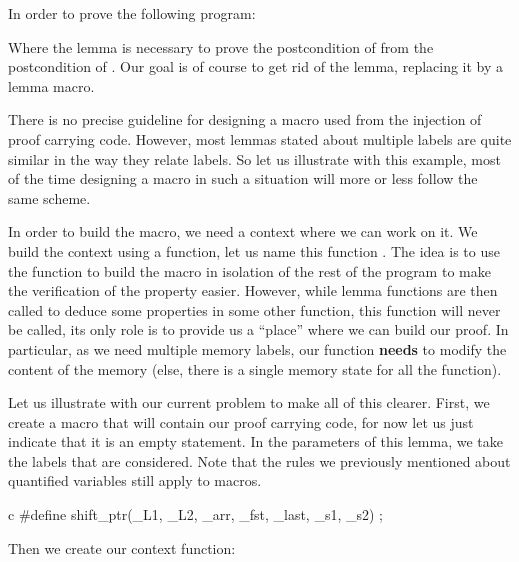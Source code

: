 In order to prove the following program:




Where the lemma  is necessary to prove the postcondition
of  from the postcondition of . Our
goal is of course to get rid of the lemma, replacing it by a lemma macro.



There is no precise guideline for designing a macro used from the injection of
proof carrying code. However, most lemmas stated about multiple labels are quite
similar in the way they relate labels. So let us illustrate with this example,
most of the time designing a macro in such a situation will more or less follow
the same scheme.



In order to build the macro, we need a context where we can work on it. We build
the context using a function, let us name this function
. The idea is to use the function to
build the macro in isolation of the rest of the program to make the verification
of the property easier. However, while lemma functions are then called to deduce
some properties in some other function, this function will never be called, its
only role is to provide us a ``place'' where we can build our proof. In
particular, as we need multiple memory labels, our function \textbf{needs} to
modify the content of the memory (else, there is a single memory state for all
the function).



Let us illustrate with our current problem to make all of this clearer. First,
we create a macro  that will contain our proof carrying
code, for now let us just indicate that it is an empty statement. In the
parameters of this lemma, we take the labels that are considered. Note that the
rules we previously mentioned about quantified variables still apply to macros.


\begin{CodeBlock}{c}
#define shift_ptr(_L1, _L2, _arr, _fst, _last, _s1, _s2) ;
\end{CodeBlock}


Then we create our context function:




